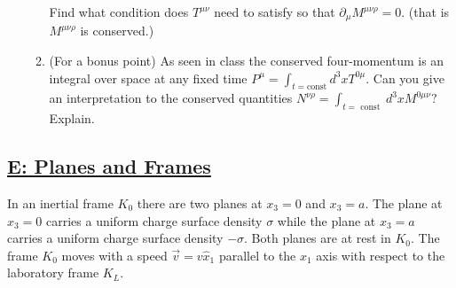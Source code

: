 \begin{enumerate}
\begin{enumerate}
		Find what condition does $T^{\mu \nu}$ need to satisfy so that $\partial_{\mu} M^{\mu \nu \rho}=0$. (that is $M^{\mu \nu \rho}$ is conserved.)
		\item (For a bonus point) As seen in class the conserved four-momentum is an integral over space at any fixed time $P^{\mu}=\int_{t=\mathrm{const}} d^{3} x T^{0 \mu} .$ Can you give an interpretation to the conserved quantities $N^{\nu \rho}=\int_{t=\text { const }} d^{3} x M^{0 \mu \nu} ?$ Explain.
	\end{enumerate}
\end{enumerate}

\subsection{\hyperref[E: Planes and Frames]{E: Planes and Frames}}

In an inertial frame $K_{0}$ there are two planes at $x_{3}=0$ and $x_{3}=a .$ The plane at $x_{3}=0$ carries a uniform charge surface density $\sigma$ while the plane at $x_{3}=a$ carries a uniform charge surface density $-\sigma .$ Both planes are at rest in $K_{0}$. The frame $K_{0}$ moves with a speed $\vec{v}=v \hat{x}_{1}$ parallel to the $x_{1}$ axis with respect to the laboratory frame $K_{L}$.

